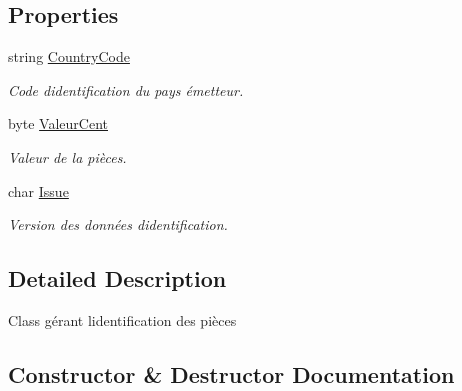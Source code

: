 \subsection*{Properties}
\begin{DoxyCompactItemize}
\item 
string \mbox{\hyperlink{class_device_library_1_1_c_canal_1_1_c_coind_i_d_a5f6355b90eecf003b109c73dffde52e5}{Country\+Code}}
\begin{DoxyCompactList}\small\item\em Code d\textquotesingle{}identification du pays émetteur. \end{DoxyCompactList}\item 
byte \mbox{\hyperlink{class_device_library_1_1_c_canal_1_1_c_coind_i_d_a0fdc934186beed598fe42ad82a75a3fa}{Valeur\+Cent}}
\begin{DoxyCompactList}\small\item\em Valeur de la pièces. \end{DoxyCompactList}\item 
char \mbox{\hyperlink{class_device_library_1_1_c_canal_1_1_c_coind_i_d_aaa7709d1d94fb5d841ca1b3ef0bb47e3}{Issue}}
\begin{DoxyCompactList}\small\item\em Version des données d\textquotesingle{}identification. \end{DoxyCompactList}\end{DoxyCompactItemize}


\subsection{Detailed Description}
Class gérant l\textquotesingle{}identification des pièces 



\subsection{Constructor \& Destructor Documentation}
\mbox{\label{class_device_library_1_1_c_canal_1_1_c_coind_i_d_ac2a7783bef16f50936b86c40cf9d6b73}} 

